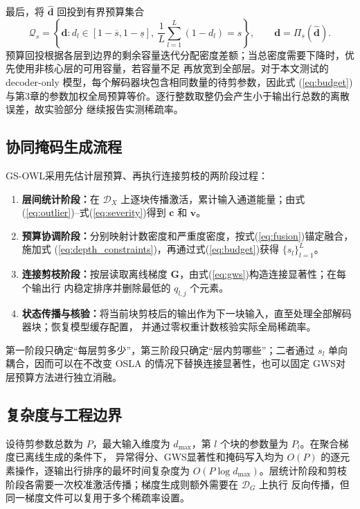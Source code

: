 \documentclass[UTF8,fontset=fandol]{ctexart}
\newcommand{\method}{GS-OWL}
\newcommand{\gws}{\textsc{GWS}}
\begin{document}
最后，将 $\widehat{\bm d}$ 回投到有界预算集合
\begin{equation}
\mathcal Q_s=
\left\{
\bm d:
d_l\in[1-\overline s,1-\underline s],\
\frac{1}{L}\sum_{l=1}^{L}(1-d_l)=s
\right\},
\qquad
\bm d=\Pi_s(\widehat{\bm d}).
\label{eq:budget}
\end{equation}
预算回投根据各层到边界的剩余容量迭代分配密度差额；当总密度需要下降时，优先使用非核心层的可用容量，若容量不足
再放宽到全部层。对于本文测试的 decoder-only 模型，每个解码器块包含相同数量的待剪参数，因此式
(\ref{eq:budget})与第3章的参数加权全局预算等价。逐行整数取整仍会产生小于输出行总数的离散误差，故实验部分
继续报告实测稀疏率。

\subsection{协同掩码生成流程}

\method 采用先估计层预算、再执行连接剪枝的两阶段过程：
\begin{enumerate}[leftmargin=2.3em,itemsep=2pt,topsep=2pt]
  \item \textbf{层间统计阶段：}在 $\mathcal D_X$ 上逐块传播激活，累计输入通道能量；由式
  (\ref{eq:outlier})--式(\ref{eq:severity})得到 $\bm c$ 和 $\bm v$。
  \item \textbf{预算协调阶段：}分别映射计数密度和严重度密度，按式(\ref{eq:fusion})锚定融合，施加式
  (\ref{eq:depth_constraints})，再通过式(\ref{eq:budget})获得 $\{s_l\}_{l=1}^{L}$。
  \item \textbf{连接剪枝阶段：}按层读取离线梯度 $\bm G$，由式(\ref{eq:gws})构造连接显著性；在每个输出行
  内稳定排序并删除最低的 $q_{l,j}$ 个元素。
  \item \textbf{状态传播与核验：}将当前块剪枝后的输出作为下一块输入，直至处理全部解码器块；恢复模型缓存配置，
  并通过零权重计数核验实际全局稀疏率。
\end{enumerate}
第一阶段只确定“每层剪多少”，第三阶段只确定“层内剪哪些”；二者通过 $s_l$ 单向耦合，因而可以在不改变
OSLA 的情况下替换连接显著性，也可以固定 \gws 对层预算方法进行独立消融。

\subsection{复杂度与工程边界}

设待剪参数总数为 $P$，最大输入维度为 $d_{\max}$，第 $l$ 个块的参数量为 $P_l$。在聚合梯度已离线生成的条件下，
异常得分、\gws 显著性和掩码写入均为 $O(P)$ 的逐元素操作，逐输出行排序的最坏时间复杂度为
$O(P\log d_{\max})$。层统计阶段和剪枝阶段各需要一次校准激活传播；梯度生成则额外需要在 $\mathcal D_G$ 上执行
反向传播，但同一梯度文件可以复用于多个稀疏率设置。
\end{document}

